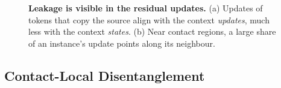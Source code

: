 \begin{figure}[t]
  \centering
  \caption{\textbf{Leakage is visible in the residual updates.} (a) Updates of tokens that copy the source
  align with the context \emph{updates}, much less with the context \emph{states}. (b) Near contact regions,
  a large share of an instance's update points along its neighbour.}
  \label{fig:diagnostics}
\end{figure}

\subsection{Contact-Local Disentanglement}  %
\label{sec:contact}

